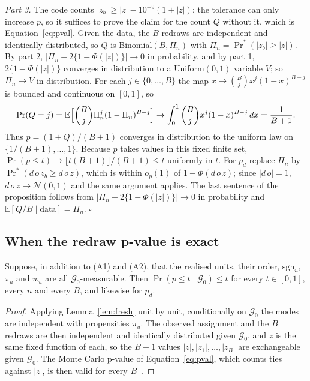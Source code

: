 \emph{Part 3.} The code counts $|z_b| \ge |z| - 10^{-9}(1 + |z|)$; the tolerance
can only increase $p$, so it suffices to prove the claim for the count $Q$ without it, which
is Equation~\eqref{eq:pval}. Given the data, the $B$ redraws are independent and identically
distributed, so $Q$ is Binomial$(B, \Pi_n)$ with $\Pi_n = \Pr^*(|z_b| \ge |z|)$. By part 2,
$|\Pi_n - 2\{1 - \Phi(|z|)\}| \to 0$ in probability, and by part 1,
$2\{1 - \Phi(|z|)\}$ converges in distribution to a Uniform$(0, 1)$ variable $V$; so $\Pi_n \to V$ in
distribution. For each $j \in \{0, \dots, B\}$ the map
$x \mapsto \binom{B}{j} x^j (1 - x)^{B - j}$ is bounded and continuous on $[0, 1]$, so
\begin{equation*}
\Pr(Q = j) = \mathbb{E}\Bigl[\binom{B}{j} \Pi_n^j (1 - \Pi_n)^{B - j}\Bigr]
\to \int_0^1 \binom{B}{j} x^j (1 - x)^{B - j}\, dx = \frac{1}{B + 1}.
\end{equation*}
Thus $p = (1 + Q) / (B + 1)$ converges in distribution to the uniform law on
$\{1/(B+1), \dots, 1\}$. Because $p$ takes values in this fixed finite set,
$\Pr(p \le t) \to \lfloor t (B + 1) \rfloor / (B + 1) \le t$ uniformly in $t$. For $p_d$ replace
$\Pi_n$ by $\Pr^*(d\, o\, z_b \ge d\, o\, z)$, which is within $o_p(1)$ of $1 - \Phi(d\, o\, z)$;
since $|d\, o| = 1$, $d\, o\, z \to \mathcal{N}(0, 1)$ and the same argument applies. The last
sentence of the proposition follows from $|\Pi_n - 2\{1 - \Phi(|z|)\}| \to 0$ in probability and
$\mathbb{E}[Q / B \mid \text{data}] = \Pi_n$.
\hfill$\square$

\subsection{When the redraw p-value is exact}
\label{app:proof_exact}

\begin{lemma}
\label{lem:exact}
Suppose, in addition to (A1) and (A2), that the realised units, their order, $\mathrm{sgn}_u$,
$\pi_u$ and $w_u$ are all $\mathcal{G}_0$-measurable. Then $\Pr(p \le t \mid \mathcal{G}_0) \le t$
for every $t \in [0, 1]$, every $n$ and every $B$, and likewise for $p_d$.
\end{lemma}

\begin{proof}
Applying Lemma~\ref{lem:fresh} unit by unit, conditionally on $\mathcal{G}_0$ the modes are
independent with propensities $\pi_u$. The observed assignment and the $B$ redraws are then independent
and identically distributed given $\mathcal{G}_0$, and $z$ is the same fixed function of each, so
the $B + 1$ values $|z|, |z_1|, \dots, |z_B|$ are exchangeable given $\mathcal{G}_0$. The Monte Carlo
p-value of Equation~\eqref{eq:pval}, which counts ties against $|z|$, is then valid for every
$B$~\cite[Sect.~4]{phipson2010permutation}.
\end{proof}


